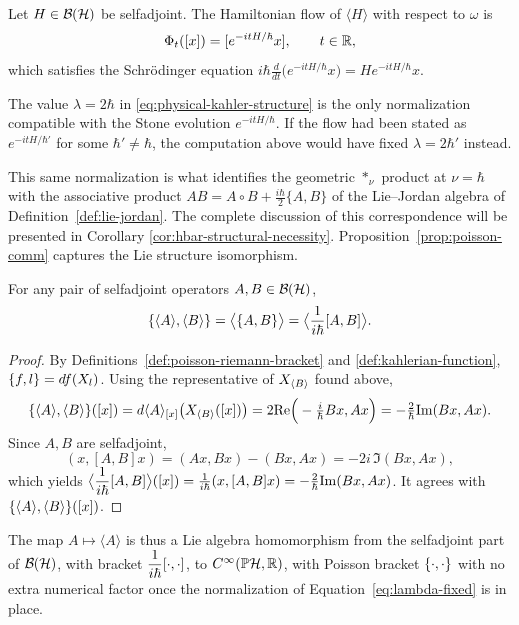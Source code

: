 \begin{proposition}
	\label{prop:hamiltonian-schrodinger}
	Let $H\in\BH$ be selfadjoint. The Hamiltonian flow of $\langle H\rangle$ with respect to $\omega$ is
	\[
	\Phi_t([x])=[e^{-itH/\hbar}x], \qquad t\in\mathbb{R},
	\]
	which satisfies the Schrödinger equation
	$i\hbar\frac{d}{dt}\big(e^{-itH/\hbar}x\big)=He^{-itH/\hbar}x$.
\end{proposition}


\begin{remark}
	The value $\lambda=2\hbar$ in \eqref{eq:physical-kahler-structure} is the only normalization compatible with the Stone evolution $e^{-itH/\hbar}$. If the flow had been stated as $e^{-itH/\hbar'}$ for some $\hbar'\neq\hbar$, the computation above would have fixed $\lambda=2\hbar'$ instead.
\end{remark}

\noindent This same normalization is what identifies the geometric $*_{\nu}$
product at $\nu=\hbar$ with the associative product
$AB=A\circ B+\tfrac{i\hbar}{2}\{A,B\}$ of the Lie--Jordan algebra
of Definition~\ref{def:lie-jordan}. The complete discussion of this correspondence will be presented in Corollary \ref{cor:hbar-structural-necessity}. Proposition~\ref{prop:poisson-comm} captures the Lie structure isomorphism.

\begin{proposition}
	\label{prop:poisson-comm}
	For any pair of selfadjoint operators $A,B\in\BH$,
	\[
	\{\langle A\rangle,\langle B\rangle\}= \big\langle \{A,B \} \big\rangle= \big\langle\dfrac{1}{i\hbar}[A,B]\big\rangle.
	\]
\end{proposition}

\begin{proof}
	By Definitions~\ref{def:poisson-riemann-bracket} and \ref{def:kahlerian-function}, $\{f,l\}=df(X_{l})$. Using the representative of $X_{\langle B\rangle}$ found above,
	\[
	\{\langle A\rangle,\langle B\rangle\}([x])=d\langle A\rangle_{[x]}\big(X_{\langle B\rangle}([x])\big)=2\mathrm{Re}\Big(-\tfrac{i}{\hbar}Bx,Ax\Big)=-\tfrac{2}{\hbar}\mathrm{Im}(Bx,Ax).
	\]
	Since $A,B$ are selfadjoint,
	\[
	(x,[A,B]x)=(Ax,Bx)-(Bx,Ax)=-2i\,\Im(Bx,Ax),
	\]
	which yields $\big\langle\dfrac{1}{i\hbar}[A,B]\big\rangle([x])=\frac{1}{i\hbar}(x,[A,B]x)=-\frac{2}{\hbar}\mathrm{Im}(Bx,Ax)$. It  agrees with $\{\langle A\rangle,\langle B\rangle\}([x])$.
\end{proof}

\begin{remark}
	The map $A\mapsto\langle A\rangle$ is thus a Lie algebra homomorphism
	from the selfadjoint part of $\BH$, with bracket $\dfrac{1}{i\hbar}[\cdot,\cdot]$,
	to $C^\infty(\PH,\R)$, with Poisson bracket $\{\cdot,\cdot\}$ with no
	extra numerical factor once the normalization of Equation~\eqref{eq:lambda-fixed}
	is in place.
\end{remark}

